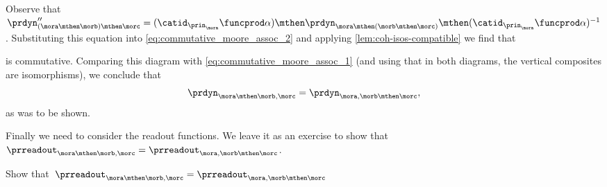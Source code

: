 %
Observe that~$\prdyn''_{(\mora \mthen \morb) \mthen \morc} =  (\catid_{\prin_{\mora}} \funcprod \alpha) \mthen \prdyn_{\mora \mthen (\morb \mthen \morc)} \mthen (\catid_{\prin_{\mora}} \funcprod \alpha)^{-1}$.
Substituting this equation into \cref{eq:commutative_moore_assoc_2} and applying \cref{lem:coh-isos-compatible} we find that
%
\begin{widepar}
\end{widepar}
%
is commutative.
Comparing this diagram with \cref{eq:commutative_moore_assoc_1} (and using that in both diagrams, the vertical composites are isomorphisms), we conclude that
\begin{equation*}
    \prdyn_{\mora \mthen \morb, \morc} = \prdyn_{\mora, \morb \mthen \morc},
\end{equation*}
as was to be shown.

Finally we need to consider the readout functions.
We leave it as an exercise to show that~$\prreadout_{\mora \mthen \morb, \morc} = \prreadout_{\mora, \morb \mthen \morc}$.

\begin{exercise}
    Show that~$\prreadout_{\mora \mthen \morb, \morc} = \prreadout_{\mora, \morb \mthen \morc}$
\end{exercise}
\begin{solution}
\end{solution}


%

